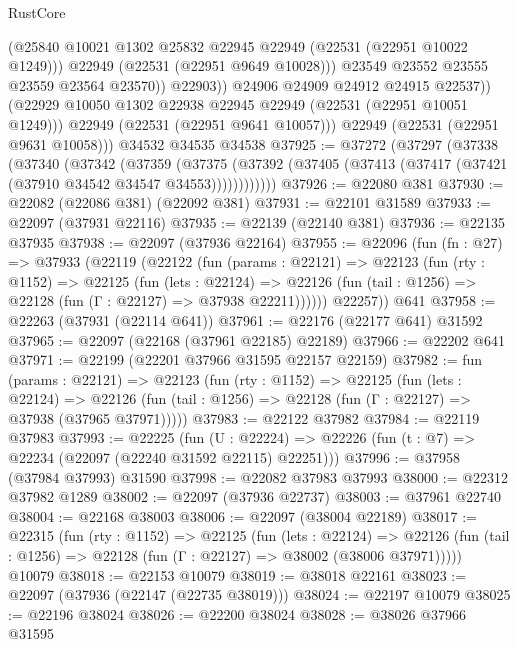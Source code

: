 \begin{lexlean}{RustCore}
\begin{coremodule}
                      (@25840 @10021 @1302 @25832 @22945 @22949 (@22531 (@22951 @10022 @1249)))
                      @22949
                      (@22531 (@22951 @9649 @10028)))
                    @23549
                    @23552
                    @23555
                    @23559
                    @23564
                    @23570))
                @22903))
            @24906
            @24909
            @24912
            @24915
            @22537))
        (@22929 @10050 @1302 @22938 @22945 @22949 (@22531 (@22951 @10051 @1249)))
        @22949
        (@22531 (@22951 @9641 @10057)))
      @22949
      (@22531 (@22951 @9631 @10058)))
    @34532
    @34535
    @34538
@37925 := @37272
    (@37297
      (@37338
        (@37340
          (@37342
            (@37359
              (@37375
                (@37392 (@37405 (@37413 (@37417 (@37421 (@37910 @34542 @34547 @34553))))))))))))
@37926 := @22080 @381
@37930 := @22082 (@22086 @381) (@22092 @381)
@37931 := @22101 @31589
@37933 := @22097 (@37931 @22116)
@37935 := @22139 (@22140 @381)
@37936 := @22135 @37935
@37938 := @22097 (@37936 @22164)
@37955 := @22096
    (fun (fn : @27) =>
    @37933
      (@22119
        (@22122
          (fun (params : @22121) =>
          @22123
            (fun (rty : @1152) =>
            @22125
              (fun (lets : @22124) =>
              @22126 (fun (tail : @1256) => @22128 (fun (Γ : @22127) => @37938 @22211))))))
        @22257))
    @641
@37958 := @22263 (@37931 (@22114 @641))
@37961 := @22176 (@22177 @641) @31592
@37965 := @22097 (@22168 (@37961 @22185) @22189)
@37966 := @22202 @641
@37971 := @22199 (@22201 @37966 @31595 @22157 @22159)
@37982 := fun (params : @22121) =>
  @22123
    (fun (rty : @1152) =>
    @22125
      (fun (lets : @22124) =>
      @22126 (fun (tail : @1256) => @22128 (fun (Γ : @22127) => @37938 (@37965 @37971)))))
@37983 := @22122 @37982
@37984 := @22119 @37983
@37993 := @22225
    (fun (U : @22224) => @22226 (fun (t : @7) => @22234 (@22097 (@22240 @31592 @22115) @22251)))
@37996 := @37958 (@37984 @37993) @31590
@37998 := @22082 @37983 @37993
@38000 := @22312 @37982 @1289
@38002 := @22097 (@37936 @22737)
@38003 := @37961 @22740
@38004 := @22168 @38003
@38006 := @22097 (@38004 @22189)
@38017 := @22315
    (fun (rty : @1152) =>
    @22125
      (fun (lets : @22124) =>
      @22126 (fun (tail : @1256) => @22128 (fun (Γ : @22127) => @38002 (@38006 @37971)))))
    @10079
@38018 := @22153 @10079
@38019 := @38018 @22161
@38023 := @22097 (@37936 (@22147 (@22735 @38019)))
@38024 := @22197 @10079
@38025 := @22196 @38024
@38026 := @22200 @38024
@38028 := @38026 @37966 @31595

\end{coremodule}
\end{lexlean}
